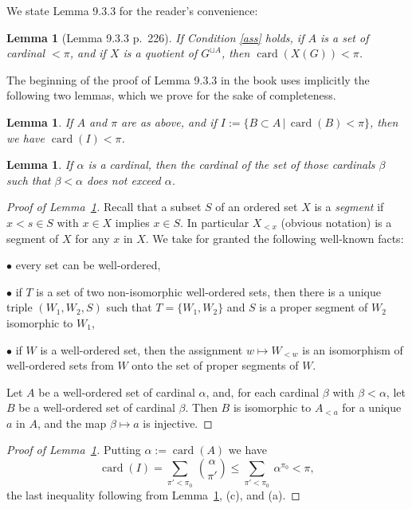 \documentclass[12pt]{article}
\newtheorem{lem}[thm]{Lemma}
\theoremstyle{remark}
\theoremstyle{definition}
\newcommand{\bu}{\bullet}
\newcommand{\nn}{\noindent}
\DeclareMathOperator{\card}{card}
\begin{document}
We state Lemma 9.3.3 for the reader's convenience:

\begin{lem}[Lemma 9.3.3 p.~226]\label{933}
If Condition \ref{ass} holds, if $A$ is a set of cardinal $<\pi$, and if $X$ is a quotient of $G^{\sqcup A}$, then $\card(X(G))<\pi$.
\end{lem}

The beginning of the proof of Lemma 9.3.3 in the book uses implicitly the following two lemmas, which we prove for the sake of completeness.

\begin{lem}\label{cardipi}
If $A$ and $\pi$ are as above, and if $I:=\{B\subset A\,|\,\card(B)<\pi\}$, then we have $\card(I)<\pi$. 
\end{lem}

\begin{lem}\label{ord}
If $\alpha$ is a cardinal, then the cardinal of the set of those cardinals $\beta$ such that $\beta<\alpha$ does not exceed $\alpha$.
\end{lem}

\begin{proof}[Proof of Lemma~\ref{ord}]
Recall that a subset $S$ of an ordered set $X$ is a {\em segment} if $x<s\in S$ with $x\in X$ implies $x\in S$. In particular $X_{<x}$ (obvious notation) is a segment of $X$ for any $x$ in $X$. We take for granted the following well-known facts:

\nn$\bu$ every set can be well-ordered,

\nn$\bu$ if $T$ is a set of two non-isomorphic well-ordered sets, then there is a unique triple $(W_1,W_2,S)$ such that $T=\{W_1,W_2\}$ and $S$ is a proper segment of $W_2$ isomorphic to $W_1$,

\nn$\bu$ if $W$ is a well-ordered set, then the assignment $w\mapsto W_{<w}$ is an isomorphism of well-ordered sets from $W$ onto the set of proper segments of $W$.

Let $A$ be a well-ordered set of cardinal $\alpha$, and, for each cardinal $\beta$ with $\beta<\alpha$, let $B$ be a well-ordered set of cardinal $\beta$. Then $B$ is isomorphic to $A_{<a}$ for a unique $a$ in $A$, and the map $\beta\mapsto a$ is injective.
\end{proof}

\begin{proof}[Proof of Lemma~\ref{cardipi}] 
Putting $\alpha:=\card(A)$ we have
$$
\card(I)=\sum_{\pi'<\pi_0}\ \binom{\alpha}{\pi'}\le\sum_{\pi'<\pi_0}\ \alpha^{\pi_0}<\pi,
$$ 
the last inequality following from Lemma~\ref{ord}, (c), and (a). 
\end{proof}
\end{document}
